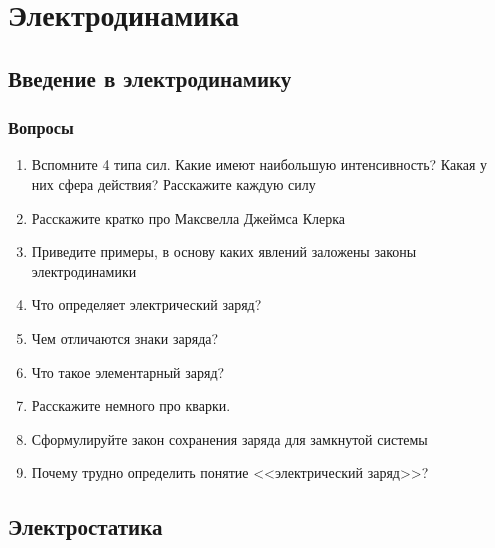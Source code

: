 \documentclass[12pt,a4paper]{report}
\begin{document}

\part{Электродинамика}
\setcounter{chapter}{-1}
\chapter{Введение в электродинамику}
\section{Вопросы}
\begin{enumerate}
\item Вспомните 4 типа сил. Какие имеют наибольшую интенсивность? Какая у них сфера действия? Расскажите каждую силу
\item Расскажите кратко про Максвелла Джеймса Клерка
\item Приведите примеры, в основу каких явлений заложены законы электродинамики
\item Что определяет электрический заряд?
\item Чем отличаются знаки заряда?
\item Что такое элементарный заряд?
\item Расскажите немного про кварки.
\item Сформулируйте закон сохранения заряда для замкнутой системы
\item Почему трудно определить понятие <<электрический заряд>>?
\end{enumerate}


\chapter{Электростатика}
\end{document}
